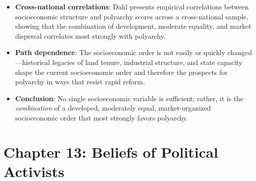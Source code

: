 \documentclass[12pt]{article}
\begin{document}
\begin{itemize}[leftmargin=*, itemsep=4pt]
    \item \textbf{Cross-national correlations}: Dahl presents empirical correlations between socioeconomic structure and polyarchy scores across a cross-national sample, showing that the combination of development, moderate equality, and market dispersal correlates most strongly with polyarchy.
    \item \textbf{Path dependence}: The socioeconomic order is not easily or quickly changed---historical legacies of land tenure, industrial structure, and state capacity shape the current socioeconomic order and therefore the prospects for polyarchy in ways that resist rapid reform.
    \item \textbf{Conclusion}: No single socioeconomic variable is sufficient; rather, it is the \emph{combination} of a developed, moderately equal, market-organized socioeconomic order that most strongly favors polyarchy.
\end{itemize}

\section{Chapter 13: Beliefs of Political Activists}
\end{document}
